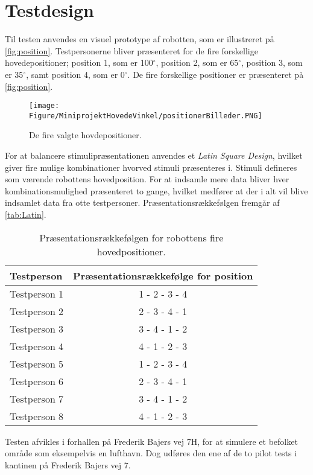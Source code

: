 \section{Testdesign}
\label{SkaleringseksperimentTestdesign}
%
Til testen anvendes en visuel prototype af robotten, som er illustreret på \autoref{fig:position}. Testpersonerne bliver præsenteret for de fire forskellige hovedepositioner; position 1, som er 100$^{\circ}$, position 2, som er 65$^{\circ}$, position 3, som er 35$^{\circ}$, samt position 4, som er 0$^{\circ}$. De fire forskellige positioner er præsenteret på \autoref{fig:position}.   
%
\begin{figure}[H]
\centering
\texttt{[image: Figure/MiniprojektHovedeVinkel/positionerBilleder.PNG]} 
\caption{De fire valgte hovdepositioner.}
\label{fig:position}
\end{figure}
\noindent 
%
For at balancere stimulipræsentationen anvendes et \textit{Latin Square Design}, hvilket giver fire mulige kombinationer hvorved stimuli præsenteres i. Stimuli defineres som værende robottens hovedposition. For at indsamle mere data bliver hver kombinationsmulighed præsenteret to gange, hvilket medfører at der i alt vil blive indsamlet data fra otte testpersoner. Præsentationsrækkefølgen fremgår af \autoref{tab:Latin}.  
%
\begin{table}[H]
	\centering
	\begin{tabular}{l|c}
		Testperson     & Præsentationsrækkefølge for position \\\hline
		Testperson 1   & 1 - 2 - 3 - 4          \\\hline
		Testperson 2   & 2 - 3 - 4 - 1          \\\hline
		Testperson 3   & 3 - 4 - 1 - 2          \\\hline
		Testperson 4   & 4 - 1 - 2 - 3          \\\hline
		Testperson 5   & 1 - 2 - 3 - 4          \\\hline
		Testperson 6   & 2 - 3 - 4 - 1          \\\hline
		Testperson 7   & 3 - 4 - 1 - 2          \\\hline
		Testperson 8   & 4 - 1 - 2 - 3   
	\end{tabular}
	\caption{Præsentationsrækkefølgen for robottens fire hovedpositioner.}
	\label{tab:Latin}         
\end{table}
\noindent
%
Testen afvikles i forhallen på Frederik Bajers vej 7H, for at simulere et befolket område som eksempelvis en lufthavn. Dog udføres den ene af de to pilot tests i kantinen på Frederik Bajers vej 7.
%
